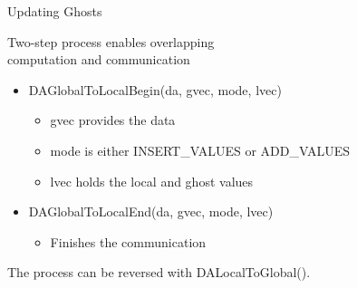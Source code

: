\begin{frame}{Updating Ghosts}

Two-step process enables overlapping\\
computation and communication

\medskip

\begin{itemize}
  \item {\kb DAGlobalToLocalBegin(da, gvec, mode, lvec)}
  \begin{itemize}
    \item {\kb gvec} provides the data 
    \item {\kb mode} is either {\kb INSERT\_VALUES} or {\kb ADD\_VALUES}
    \item {\kb lvec} holds the local and ghost values
  \end{itemize}

  \item {\kb DAGlobalToLocalEnd(da, gvec, mode, lvec)}
  \begin{itemize}
    \item Finishes the communication
  \end{itemize}
\end{itemize}

\medskip

The process can be reversed with {\kb DALocalToGlobal()}.
\end{frame}
